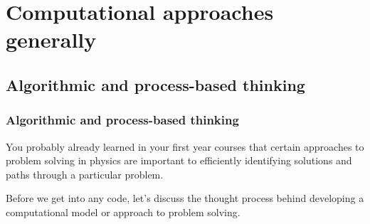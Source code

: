 \documentclass[hyperref={colorlinks=true}]{beamer}
\begin{document}
\section[Computational approaches generally]{Computational approaches generally}

\subsection[Algorithmic and process-based thinking]{Algorithmic and process-based thinking}

\begin{frame}%
  \frametitle{Algorithmic and process-based thinking}
    
  You probably already learned in your first year courses that certain approaches to problem solving in physics are important to efficiently identifying solutions and paths through a particular problem. 
  
  \vspace{1cm}
  
  Before we get into any code, let's discuss the thought process behind developing a computational model or approach to problem solving. 
    
\end{frame}

\end{document}
